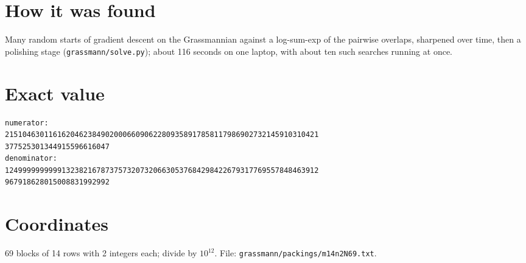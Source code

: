 \documentclass[11pt,a4paper]{article}
\begin{document}
\section{How it was found}
Many random starts of gradient descent on the Grassmannian against a log-sum-exp of the pairwise overlaps, sharpened over time, then a polishing stage (\texttt{grassmann/solve.py}); about 116 seconds on one laptop, with about ten such searches running at once.


\appendix
\section{Exact value}
{\small
\begin{verbatim}
numerator:
215104630116162046238490200066090622809358917858117986902732145910310421
377525301344915596616047
denominator:
124999999999913238216787375732073206630537684298422679317769557848463912
967918628015008831992992
\end{verbatim}}

\section{Coordinates}
69 blocks of 14 rows with 2 integers each; divide by $10^{12}$. File: \texttt{grassmann/packings/m14n2N69.txt}.
{\tiny
\begin{multicols}{4}
\end{multicols}}
\end{document}
